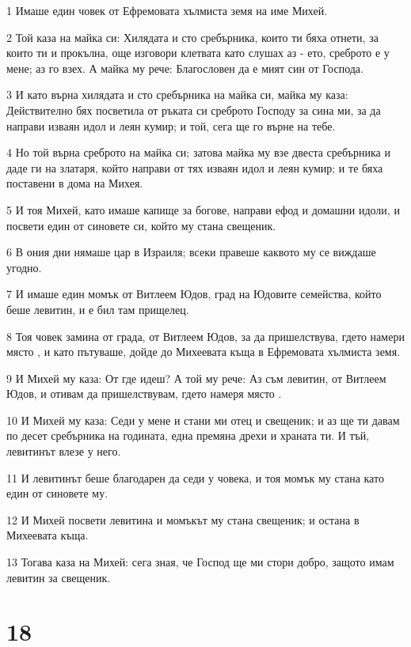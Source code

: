 \par 1 Имаше един човек от Ефремовата хълмиста земя на име Михей.
\par 2 Той каза на майка си: Хилядата и сто сребърника, които ти бяха отнети, за които ти и прокълна, още изговори клетвата като слушах аз - ето, среброто е у мене; аз го взех. А майка му рече: Благословен да е мият син от Господа.
\par 3 И като върна хилядата и сто сребърника на майка си, майка му каза: Действително бях посветила от ръката си среброто Господу за сина ми, за да направи изваян идол и леян кумир; и той, сега ще го върне на тебе.
\par 4 Но той върна среброто на майка си; затова майка му взе двеста сребърника и даде ги на златаря, който направи от тях изваян идол и леян кумир; и те бяха поставени в дома на Михея.
\par 5 И тоя Михей, като имаше капище за богове, направи ефод и домашни идоли, и посвети един от синовете си, който му стана свещеник.
\par 6 В ония дни нямаше цар в Израиля; всеки правеше каквото му се виждаше угодно.
\par 7 И имаше един момък от Витлеем Юдов, град на Юдовите семейства, който беше левитин, и е бил там прищелец.
\par 8 Тоя човек замина от града, от Витлеем Юдов, за да пришелствува, гдето намери място , и като пътуваше, дойде до Михеевата къща в Ефремовата хълмиста земя.
\par 9 И Михей му каза: От где идеш? А той му рече: Аз съм левитин, от Витлеем Юдов, и отивам да пришелствувам, гдето намеря място .
\par 10 И Михей му каза: Седи у мене и стани ми отец и свещеник; и аз ще ти давам по десет сребърника на годината, една премяна дрехи и храната ти. И тъй, левитинът влезе у него.
\par 11 И левитинът беше благодарен да седи у човека, и тоя момък му стана като един от синовете му.
\par 12 И Михей посвети левитина и момъкът му стана свещеник; и остана в Михеевата къща.
\par 13 Тогава каза на Михей: сега зная, че Господ ще ми стори добро, защото имам левитин за свещеник.

\chapter{18}

